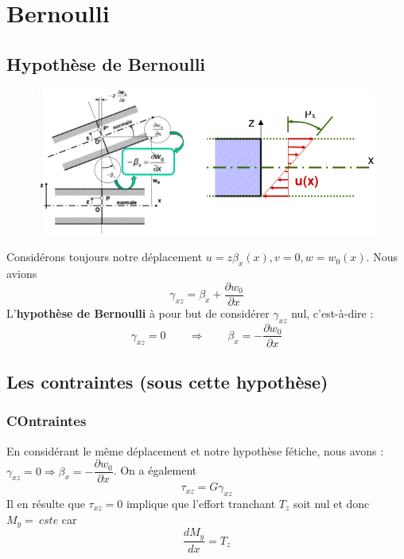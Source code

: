 \section{Bernoulli}
	\subsection{Hypothèse de Bernoulli}
	\begin{figure}
	\vspace{-5mm}
	\includegraphics[scale=0.45]{ch4/image4.png}
	\end{figure}
	Considérons toujours notre déplacement $u=z\beta_x(x), v=0,w=w_0(x)$.	
	Nous avions 
	\begin{equation}
	\gamma_{xz} = \beta_x+\dfrac{\partial w_0}{\partial x}
	\end{equation}
	L'\textbf{hypothèse de Bernoulli} à pour but de considérer $\gamma_{xz}$ 
	nul, c'est-à-dire :
	\begin{equation}
	\gamma_{xz} = 0\qquad\Longrightarrow\qquad \beta_x = -\dfrac{\partial w_0}{
	\partial x}
	\end{equation}
	 
	\newpage
	\subsection{Les contraintes (sous cette hypothèse)}
		\subsubsection{COntraintes}
		En considérant le même déplacement et notre hypothèse fétiche, nous 
		avons : $\gamma_{xz} = 0 \Longrightarrow \beta_x = -\dfrac{\partial w_0}{
		\partial x}$. On a également
		\begin{equation}
		\tau_{xz} = G\gamma_{xz}
		\end{equation}
		Il en résulte que $\tau_{xz}=0$ implique que l'effort tranchant $T_z$ soit 
		nul et donc $M_y =\ cste$ car 
		\begin{equation}
		\dfrac{dM_y}{dx} = T_z
		\end{equation}
		
